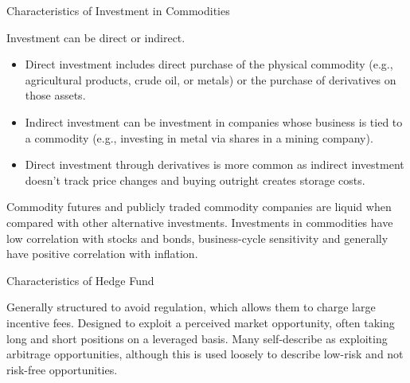 \documentclass[../custom]{flashcards}
\begin{document}
\begin{flashcard}{Characteristics of Investment in Commodities}
    \begin{flushleft}
        Investment can be direct or indirect.
        \begin{itemize}
            \item Direct investment includes direct purchase of the physical commodity (e.g., agricultural products, crude oil, or metals) or the purchase of derivatives on those assets.
            \item Indirect investment can be investment in companies whose business is tied to a commodity (e.g., investing in metal via shares in a mining company).
            \item Direct investment through derivatives is more common as indirect investment doesn't track price changes and buying outright creates storage costs.
        \end{itemize}
        Commodity futures and publicly traded commodity companies are liquid when compared with other alternative investments. Investments in commodities have low correlation with stocks and bonds, business-cycle sensitivity and generally have positive correlation with inflation.
    \end{flushleft}
\end{flashcard}

\begin{flashcard}{Characteristics of Hedge Fund}
    \begin{flushleft}
        Generally structured to avoid regulation, which allows them to charge large incentive fees. Designed to exploit a perceived market opportunity, often taking long and short positions on a leveraged basis. Many self-describe as exploiting arbitrage opportunities, although this is used loosely to describe low-risk and not risk-free opportunities.
    \end{flushleft}
\end{flashcard}
\end{document}
